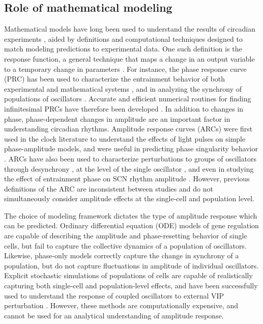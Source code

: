 \subsection{Role of mathematical modeling}
Mathematical models have long been used to understand the results of circadian experiments \cite{Leloup2003, Becker-Weimann2004}, aided by definitions and computational techniques designed to match modeling predictions to experimental data.
One such definition is the response function, a general technique that maps a change in an output variable to a temporary change in parameters \cite{Rand2004}.
For instance, the phase response curve (PRC) has been used to characterize the entrainment behavior of both experimental and mathematical systems \cite{Daan1976, Taylor2008, Pfeuty2011}, and in analyzing the synchrony of populations of oscillators \cite{Kim2014}.
Accurate and efficient numerical routines for finding infinitesimal PRCs have therefore been developed \cite{Kramer1984, Gunawan2006, Taylor2008a}.
In addition to changes in phase, phase-dependent changes in amplitude are an important factor in understanding circadian rhythms.
Amplitude response curves (ARCs) were first used in the clock literature to understand the effects of light pulses on simple phase-amplitude models, and were useful in predicting phase singularity behavior \cite{Jewett1998}.
ARCs have also been used to characterize perturbations to groups of oscillators through desynchrony \cite{Achermann1999, Ukai2007}, at the level of the single oscillator \cite{VanderVeen2012, Castejon2013}, and even in studying the effect of entrainment phase on SCN rhythm amplitude \cite{VanOosterhout2012}.
However, previous definitions of the ARC are inconsistent between studies and do not simultaneously consider amplitude effects at the single-cell and population level.

The choice of modeling framework dictates the type of amplitude response which can be predicted.
Ordinary differential equation (ODE) models of gene regulation are capable of describing the amplitude and phase-resetting behavior of single cells, but fail to capture the collective dynamics of a population of oscillators.
Likewise, phase-only models correctly capture the change in synchrony of a population, but do not capture fluctuations in amplitude of individual oscillators.
Explicit stochastic simulations of populations of cells are capable of realistically capturing both single-cell and population-level effects, and have been successfully used to understand the response of coupled oscillators to external VIP perturbation \cite{An2013}.
However, these methods are computationally expensive, and cannot be used for an analytical understanding of amplitude response.

